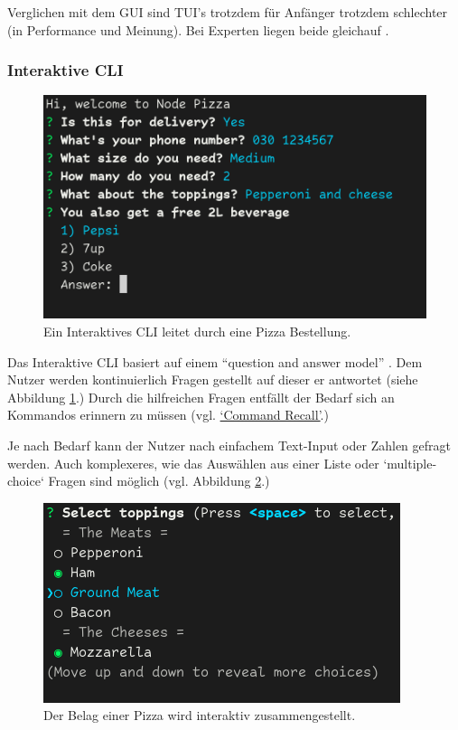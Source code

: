 \documentclass[oneside,bibliography=totocnumbered,BCOR=5mm]{scrbook}
\begin{document}
Verglichen mit dem GUI sind TUI's trotzdem für Anfänger trotzdem schlechter
(in Performance und Meinung). Bei Experten liegen beide gleichauf
\parencite{tuivsgui}.

\subsubsection{Interaktive CLI}
\label{sec:def-interactive}

\begin{figure}[H]
  \centering
  \includegraphics[scale=0.5]{interactive-example.png}
  \caption{Ein Interaktives CLI leitet durch eine Pizza Bestellung.}
  \label{fig:interactive-example}
\end{figure}

Das Interaktive CLI basiert auf einem ``question and answer model''
\parencite[42]{Spolsky_2001}. Dem Nutzer werden kontinuierlich Fragen gestellt
auf dieser er antwortet (siehe Abbildung \ref{fig:interactive-example}.) Durch
die hilfreichen Fragen entfällt der Bedarf sich an Kommandos erinnern zu müssen
(vgl. \hyperref[prob:cr]{`Command Recall'}.)

Je nach Bedarf kann der Nutzer nach einfachem Text-Input oder Zahlen
gefragt werden. Auch komplexeres, wie das Auswählen aus einer
Liste oder `multiple-choice` Fragen sind möglich (vgl. Abbildung
\ref{fig:interactive-example2}.)

\begin{figure}[H]
  \centering
  \includegraphics[scale=0.5]{interactive-example2.png}
  \caption{Der Belag einer Pizza wird interaktiv zusammengestellt.}
  \label{fig:interactive-example2}
\end{figure}
\end{document}
